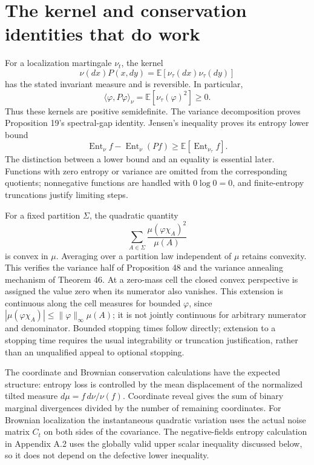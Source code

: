 \documentclass[10pt]{article}
\begin{document}
\section*{The kernel and conservation identities that do work}
For a localization martingale \(\nu_t\), the kernel \[\nu(dx)P(x,dy)=\mathbb E[\nu_\tau(dx)\nu_\tau(dy)]\] has the stated invariant measure and is reversible. In particular, \[\langle\varphi,P\varphi\rangle_\nu
   =\mathbb E[\nu_\tau(\varphi)^2]\ge0.\] Thus these kernels are positive semidefinite. The variance decomposition proves Proposition 19’s spectral-gap identity. Jensen’s inequality proves its entropy lower bound \[\operatorname{Ent}_\nu f-\operatorname{Ent}_\nu(Pf)\ge \mathbb E[\operatorname{Ent}_{\nu_\tau}f].\] The distinction between a lower bound and an equality is essential later. Functions with zero entropy or variance are omitted from the corresponding quotients; nonnegative functions are handled with \(0\log0=0\), and finite-entropy truncations justify limiting steps.\par
For a fixed partition \(\Sigma\), the quadratic quantity \[\sum_{A\in\Sigma}\frac{\mu(\varphi\chi_A)^2}{\mu(A)}\] is convex in \(\mu\). Averaging over a partition law independent of \(\mu\) retains convexity. This verifies the variance half of Proposition 48 and the variance annealing mechanism of Theorem 46. At a zero-mass cell the closed convex perspective is assigned the value zero when its numerator also vanishes. This extension is continuous along the cell measures for bounded \(\varphi\), since \(|\mu(\varphi\chi_A)|\le\|\varphi\|_\infty\mu(A)\); it is not jointly continuous for arbitrary numerator and denominator. Bounded stopping times follow directly; extension to a stopping time requires the usual integrability or truncation justification, rather than an unqualified appeal to optional stopping.\par
The coordinate and Brownian conservation calculations have the expected structure: entropy loss is controlled by the mean displacement of the normalized tilted measure \(d\mu=f\,d\nu/\nu(f)\). Coordinate reveal gives the sum of binary marginal divergences divided by the number of remaining coordinates. For Brownian localization the instantaneous quadratic variation uses the actual noise matrix \(C_t\) on both sides of the covariance. The negative-fields entropy calculation in Appendix A.2 uses the globally valid upper scalar inequality discussed below, so it does not depend on the defective lower inequality.\par
\end{document}

